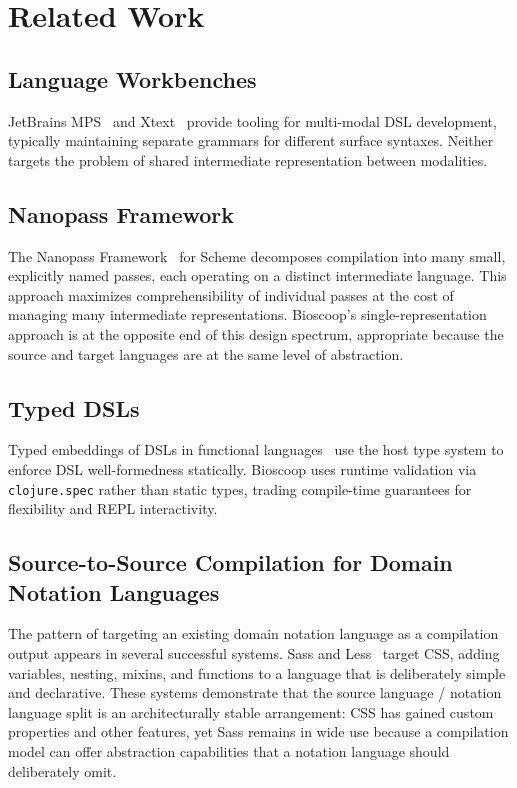 \documentclass[english,submission]{programming}
\begin{document}
\section{Related Work}

\subsection{Language Workbenches}

JetBrains MPS~\cite{mps} and Xtext~\cite{xtext} provide tooling for multi-modal DSL development, typically maintaining separate grammars for different surface syntaxes. Neither targets the problem of shared intermediate representation between modalities.

\subsection{Nanopass Framework}

The Nanopass Framework~\cite{nanopass} for Scheme decomposes compilation into many small, explicitly named passes, each operating on a distinct intermediate language. This approach maximizes comprehensibility of individual passes at the cost of managing many intermediate representations. Bioscoop's single-representation approach is at the opposite end of this design spectrum, appropriate because the source and target languages are at the same level of abstraction.

\subsection{Typed DSLs}

Typed embeddings of DSLs in functional languages~\cite{carette} use the host type system to enforce DSL well-formedness statically. Bioscoop uses runtime validation via \texttt{clojure.spec} rather than static types, trading compile-time guarantees for flexibility and REPL interactivity.

\subsection{Source-to-Source Compilation for Domain Notation Languages}

The pattern of targeting an existing domain notation language as a compilation output appears in several successful systems. Sass and Less~\cite{sass} target CSS, adding variables, nesting, mixins, and functions to a language that is deliberately simple and declarative. These systems demonstrate that the source language / notation language split is an architecturally stable arrangement: CSS has gained custom properties and other features, yet Sass remains in wide use because a compilation model can offer abstraction capabilities that a notation language should deliberately omit.
\end{document}

